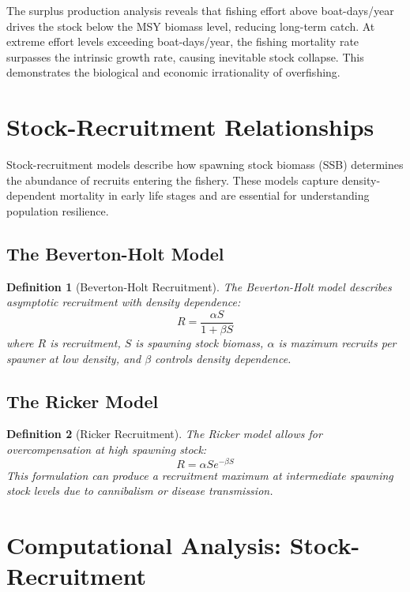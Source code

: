 \documentclass[a4paper, 11pt]{article}
\newtheorem{definition}{Definition}[section]
\begin{document}
The surplus production analysis reveals that fishing effort above 
boat-days/year drives the stock below the MSY biomass level, reducing long-term catch.
At extreme effort levels exceeding  boat-days/year, the fishing
mortality rate surpasses the intrinsic growth rate, causing inevitable stock collapse.
This demonstrates the biological and economic irrationality of overfishing.

\section{Stock-Recruitment Relationships}

Stock-recruitment models describe how spawning stock biomass (SSB) determines the
abundance of recruits entering the fishery. These models capture density-dependent
mortality in early life stages and are essential for understanding population resilience.

\subsection{The Beverton-Holt Model}

\begin{definition}[Beverton-Holt Recruitment]
The Beverton-Holt model describes asymptotic recruitment with density dependence:
\begin{equation}
R = \frac{\alpha S}{1 + \beta S}
\end{equation}
where $R$ is recruitment, $S$ is spawning stock biomass, $\alpha$ is maximum recruits
per spawner at low density, and $\beta$ controls density dependence.
\end{definition}

\subsection{The Ricker Model}

\begin{definition}[Ricker Recruitment]
The Ricker model allows for overcompensation at high spawning stock:
\begin{equation}
R = \alpha S e^{-\beta S}
\end{equation}
This formulation can produce a recruitment maximum at intermediate spawning stock levels
due to cannibalism or disease transmission.
\end{definition}

\section{Computational Analysis: Stock-Recruitment}
\end{document}
